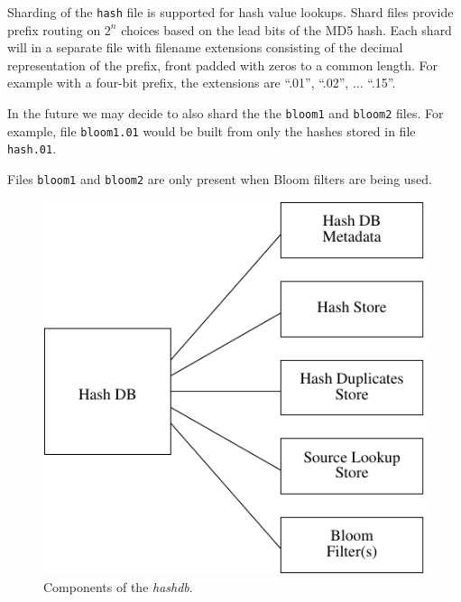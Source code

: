 \documentclass[12pt,twoside]{article}
\newcommand{\hdb}{\emph{hashdb}\xspace}
\begin{document}
\begin{compactitem}
  \item Sharding of the \texttt{hash} file is supported for hash value lookups.
        Shard files provide prefix routing on \begin{math}2^{n}\end{math} choices based
        on the lead bits of the MD5 hash.
        Each shard will in a separate file with filename extensions consisting of the
        decimal representation of the prefix, front padded with zeros to a common
        length.  For example with a four-bit prefix, the extensions are ``.01'',
        ``.02'', ... ``.15''. 
  \item In the future we may decide to also shard the 
        the \texttt{bloom1} and \texttt{bloom2} files.  For example, file \texttt{bloom1.01}
        would be built from only the hashes stored in file \texttt{hash.01}.
  \item Files \texttt{bloom1} and \texttt{bloom2} are only present when Bloom
        filters are being used.
\end{compactitem}

\begin{figure}[h]
  \center
  \includegraphics{drawings/hash_db}
  \caption{Components of the \hdb.\label{fig-hashdb}}
\end{figure}
\end{document}
